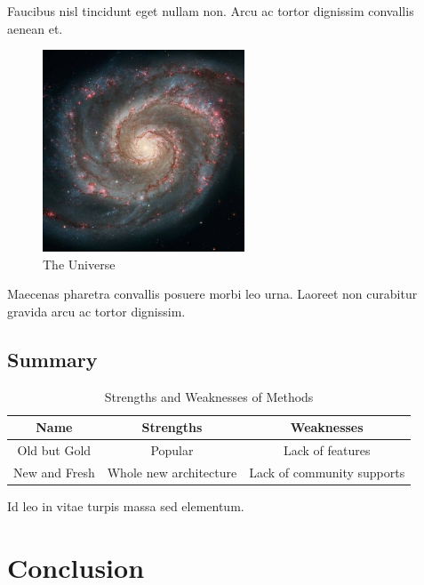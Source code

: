 \documentclass[12pt]{article}
\begin{document}
Faucibus nisl tincidunt eget nullam non.
Arcu ac tortor dignissim convallis aenean et.


\begin{figure}[ht]
    \centering
    \includegraphics[width=6cm]{img/universe.jpg}
    \caption{The Universe}
    \label{fig:universe}
\end{figure}


Maecenas pharetra convallis posuere morbi leo urna.
Laoreet non curabitur gravida arcu ac tortor dignissim.

\subsection{Summary}

\blindtext


\begin{table}[ht]
\centering
    \begin{tabular}{c | c | c}
        Name & Strengths & Weaknesses \\
        \hline
        Old but Gold & Popular & Lack of features \\
        New and Fresh & Whole new architecture & Lack of community supports
    \end{tabular}
\caption{Strengths and Weaknesses of Methods}
\label{tab:method summary}
\end{table}


Id leo in vitae turpis massa sed elementum.
\Blindtext[2]



\section{Conclusion}



\blindtext
\end{document}
